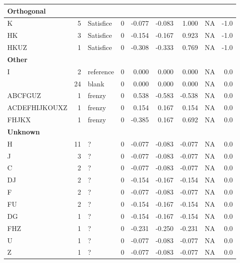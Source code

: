 \documentclass[
  letterpaper,
  DIV=11,
  numbers=noendperiod]{scrreprt}
\begin{document}
\begin{tabular}[t]{l|r|l|r|r|r|r|r|r}
\hline
\multicolumn{9}{l}{\textbf{Orthogonal}}\\
\hline
\hspace{1em}K & 5 & Satisfice & 0 & -0.077 & -0.083 & 1.000 & NA & -1.0\\
\hline
\hspace{1em}HK & 3 & Satisfice & 0 & -0.154 & -0.167 & 0.923 & NA & -1.0\\
\hline
\hspace{1em}HKUZ & 1 & Satisfice & 0 & -0.308 & -0.333 & 0.769 & NA & -1.0\\
\hline
\multicolumn{9}{l}{\textbf{Other}}\\
\hline
\hspace{1em}I & 2 & reference & 0 & 0.000 & 0.000 & 0.000 & NA & 0.0\\
\hline
\hspace{1em} & 24 & blank & 0 & 0.000 & 0.000 & 0.000 & NA & 0.0\\
\hline
\hspace{1em}ABCFGUZ & 1 & frenzy & 0 & 0.538 & -0.583 & -0.538 & NA & 0.0\\
\hline
\hspace{1em}ACDEFHIJKOUXZ & 1 & frenzy & 0 & 0.154 & 0.167 & 0.154 & NA & 0.0\\
\hline
\hspace{1em}FHJKX & 1 & frenzy & 0 & -0.385 & 0.167 & 0.692 & NA & 0.0\\
\hline
\multicolumn{9}{l}{\textbf{Unknown}}\\
\hline
\hspace{1em}H & 11 & ? & 0 & -0.077 & -0.083 & -0.077 & NA & 0.0\\
\hline
\hspace{1em}J & 3 & ? & 0 & -0.077 & -0.083 & -0.077 & NA & 0.0\\
\hline
\hspace{1em}C & 2 & ? & 0 & -0.077 & -0.083 & -0.077 & NA & 0.0\\
\hline
\hspace{1em}DJ & 2 & ? & 0 & -0.154 & -0.167 & -0.154 & NA & 0.0\\
\hline
\hspace{1em}F & 2 & ? & 0 & -0.077 & -0.083 & -0.077 & NA & 0.0\\
\hline
\hspace{1em}FU & 2 & ? & 0 & -0.154 & -0.167 & -0.154 & NA & 0.0\\
\hline
\hspace{1em}DG & 1 & ? & 0 & -0.154 & -0.167 & -0.154 & NA & 0.0\\
\hline
\hspace{1em}FHZ & 1 & ? & 0 & -0.231 & -0.250 & -0.231 & NA & 0.0\\
\hline
\hspace{1em}U & 1 & ? & 0 & -0.077 & -0.083 & -0.077 & NA & 0.0\\
\hline
\hspace{1em}Z & 1 & ? & 0 & -0.077 & -0.083 & -0.077 & NA & 0.0\\
\hline
\end{tabular}
\end{document}

